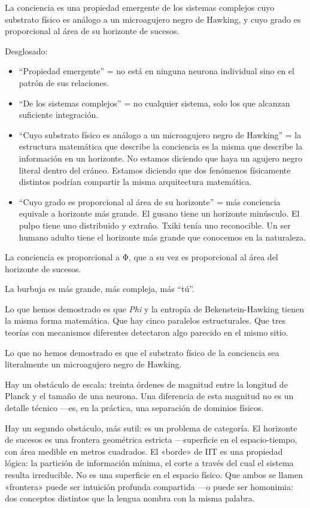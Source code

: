 \begin{tesis}
La conciencia es una propiedad emergente de los sistemas complejos cuyo substrato físico es análogo a un microagujero negro de Hawking, y cuyo grado es proporcional al área de su horizonte de sucesos.
\end{tesis}
Desglosado:
\begin{itemize}
\item “Propiedad emergente” = no está en ninguna neurona individual sino en el patrón de sus relaciones.
\item “De los sistemas complejos” = no cualquier sistema, solo los que alcanzan suficiente integración.
\item “Cuyo substrato físico es análogo a un microagujero negro de Hawking” = la estructura matemática que describe la conciencia es la misma que describe la información en un horizonte. No estamos diciendo que haya un agujero negro literal dentro del cráneo. Estamos diciendo que dos fenómenos físicamente distintos podrían compartir la misma arquitectura matemática.
\item “Cuyo grado es proporcional al área de su horizonte” = más conciencia equivale a horizonte más grande. El gusano tiene un horizonte minúsculo. El pulpo tiene uno distribuido y extraño. Txiki tenía uno reconocible. Un ser humano adulto tiene el horizonte más grande que conocemos en la naturaleza.
\end{itemize}
\begin{fisica}
 La conciencia es proporcional a Φ, que a su vez es proporcional al área del horizonte de sucesos.

 La burbuja es más grande, más compleja, más “tú”.
\end{fisica}
\noindent Lo que hemos demostrado es que \emph{Phi} y la entropía de Bekenstein-Hawking tienen la misma forma matemática. Que hay cinco paralelos estructurales. Que tres teorías con mecanismos diferentes detectaron algo parecido en el mismo sitio.

Lo que no hemos demostrado es que el substrato físico de la conciencia sea literalmente un microagujero negro de Hawking.

Hay un obstáculo de escala: treinta órdenes de magnitud entre la longitud de Planck y el tamaño de una neurona. Una diferencia de esta magnitud no es un detalle técnico —es, en la práctica, una separación de dominios físicos.

Hay un segundo obstáculo, más sutil: es un problema de categoría. El horizonte de sucesos es una frontera geométrica estricta —superficie en el espacio-tiempo, con área medible en metros cuadrados. El «borde» de IIT es una propiedad lógica: la partición de información mínima, el corte a través del cual el sistema resulta irreducible. No es una superficie en el espacio físico. Que ambos se llamen «frontera» puede ser intuición profunda compartida —o puede ser homonimia: dos conceptos distintos que la lengua nombra con la misma palabra.

